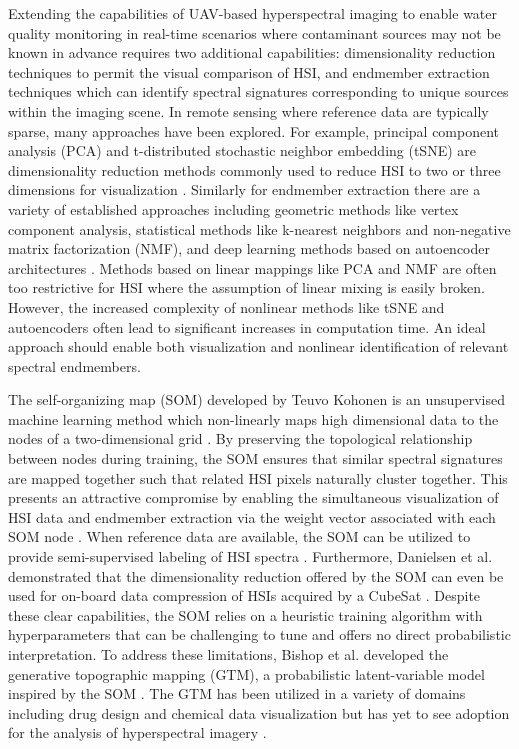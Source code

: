 \documentclass[remotesensing,article,submit,pdftex,moreauthors]{Definitions/mdpi}
\begin{document}
Extending the capabilities of UAV-based hyperspectral imaging to enable water quality monitoring in real-time scenarios where contaminant sources may not be known in advance requires two additional capabilities: dimensionality reduction techniques to permit the visual comparison of HSI, and endmember extraction techniques which can identify spectral signatures corresponding to unique sources within the imaging scene. In remote sensing where reference data are typically sparse, many approaches have been explored. For example, principal component analysis (PCA) and t-distributed stochastic neighbor embedding (tSNE) are dimensionality reduction methods commonly used to reduce HSI to two or three dimensions for visualization \cite{tyo2003principal,zhang2015hyperspectral}. Similarly for endmember extraction there are a variety of established approaches including geometric methods like vertex component analysis, statistical methods like k-nearest neighbors and non-negative matrix factorization (NMF), and deep learning methods based on autoencoder architectures \cite{heylen2014review,nascimento2005vertex, Feng2022HyperspectralUB, cariou2015unsupervised, su2019daen, borsoi2019deep, palsson2020convolutional}. Methods based on linear mappings like PCA and NMF are often too restrictive for HSI where the assumption of linear mixing is easily broken. However, the increased complexity of nonlinear methods like tSNE and autoencoders often lead to significant increases in computation time. An ideal approach should enable both visualization and nonlinear identification of relevant spectral endmembers.

The self-organizing map (SOM) developed by Teuvo Kohonen is an unsupervised machine learning method which non-linearly maps high dimensional data to the nodes of a two-dimensional grid \cite{kohonen-som-1}. By preserving the topological relationship between nodes during training, the SOM ensures that similar spectral signatures are mapped together such that related HSI pixels naturally cluster together. This presents an attractive compromise by enabling the simultaneous visualization of HSI data and endmember extraction via the weight vector associated with each SOM node \cite{cantero2004analysis, duran2007time,som-hsi}. When reference data are available, the SOM can be utilized to provide semi-supervised labeling of HSI spectra \cite{riese2019supervised}. Furthermore, Danielsen et al. demonstrated that the dimensionality reduction offered by the SOM can even be used for on-board data compression of HSIs acquired by a CubeSat \cite{danielsen2021self}. Despite these clear capabilities, the SOM relies on a heuristic training algorithm with hyperparameters that can be challenging to tune and offers no direct probabilistic interpretation. To address these limitations, Bishop et al. developed the generative topographic mapping (GTM), a probabilistic latent-variable model inspired by the SOM \cite{gtm-bishop-1}. The GTM has been utilized in a variety of domains including drug design and chemical data visualization but has yet to see adoption for the analysis of hyperspectral imagery \cite{kireeva2012generative, gaspar2015chemical, horvath2019generative}.
\end{document}

